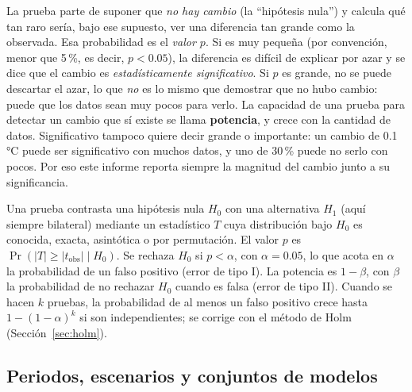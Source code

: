 \documentclass[11pt,a4paper]{article}
\begin{document}
La prueba parte de suponer que \emph{no hay cambio} (la ``hipótesis nula'') y calcula qué tan raro sería, bajo ese supuesto, ver una diferencia tan grande como la observada. 
Esa probabilidad es el \emph{valor $p$}. 
Si es muy pequeña (por convención, menor que 5\,\%, es decir, $p < 0.05$), la diferencia es difícil de explicar por azar y se dice que el cambio es \emph{estadísticamente significativo}. 
Si $p$ es grande, no se puede descartar el azar, lo que \emph{no} es lo mismo que demostrar que no hubo cambio: puede que los datos sean muy pocos para verlo. 
La capacidad de una prueba para detectar un cambio que sí existe se llama \textbf{potencia}, y crece con la cantidad de datos.
Significativo tampoco quiere decir grande o importante: un cambio de 0.1\,°C puede ser significativo con muchos datos, y uno de 30\,\% puede no serlo con pocos. 
Por eso este informe reporta siempre la magnitud del cambio junto a su significancia.

Una prueba contrasta una hipótesis nula $H_0$ con una alternativa $H_1$ (aquí siempre bilateral) mediante un estadístico $T$ cuya distribución bajo $H_0$ es conocida, exacta, asintótica o por permutación. 
El valor $p$ es $\Pr(|T| \ge |t_{\mathrm{obs}}| \mid H_0)$. 
Se rechaza $H_0$ si $p < \alpha$, con $\alpha = 0.05$, lo que acota en $\alpha$ la probabilidad de un falso positivo (error de tipo I). 
La potencia es $1-\beta$, con $\beta$ la probabilidad de no rechazar $H_0$ cuando es falsa (error de tipo II). 
Cuando se hacen $k$ pruebas, la probabilidad de al menos un falso positivo crece hasta $1-(1-\alpha)^k$ si son independientes; se corrige con el método de Holm (Sección~\ref{sec:holm}).

\subsection{Periodos, escenarios y conjuntos de modelos}
\label{sec:periodos}
\end{document}
